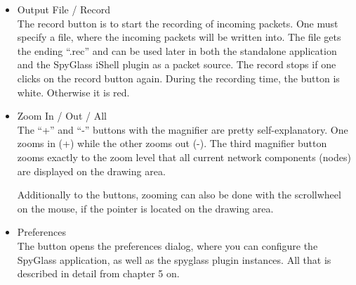 \begin{itemize}
			\item Output File / Record\\
				
				The record button is to start the recording of incoming packets. One must
				specify a file, where the incoming packets will be written into. The file gets
				the ending “.rec” and can be used later in both the standalone application
				and the SpyGlass iShell plugin as a packet source. The record stops if one
				clicks on the record button again. During the recording time, the button
				is white. Otherwise it is red.
				
			\item Zoom In / Out / All\\
				
				The “+” and “-” buttons with the magnifier are pretty self-explanatory.
				One zooms in (+) while the other zooms out (-). The third magnifier button
				zooms exactly to the zoom level that all current network components
				(nodes) are displayed on the drawing area.
				
				Additionally to the buttons, zooming can also be done with the scrollwheel
				on the mouse, if the pointer is located on the drawing area.
				
			\item Preferences\\
				
				The button opens the preferences dialog, where you can configure the
				SpyGlass application, as well as the spyglass plugin instances. All that is
				described in detail from chapter 5 on.
				
		\end{itemize}
